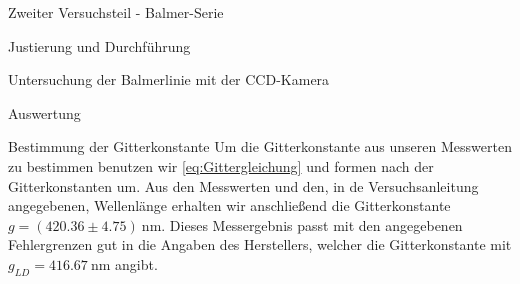 \documentclass[pdftex, a4paper,11pt, twoside, ngerman]{report}
\begin{document}
\begin{chapter}{Zweiter Versuchsteil - Balmer-Serie}
\begin{section}{Justierung und Durchführung}
\begin{subsection}{Untersuchung der Balmerlinie mit der CCD-Kamera}
      \end{subsection}

    \end{section}


    

    \begin{section}{Auswertung}
      \label{chp:Balmer:sec:Auswertung}
      
      
      
      \begin{subsection}{Bestimmung der Gitterkonstante}
        \label{chp:Balmer:sec:Auswertung:subsec:Gitterkonstante}
        Um die Gitterkonstante aus unseren Messwerten zu bestimmen benutzen 
        wir \cref{eq:Gittergleichung} und formen nach der Gitterkonstanten um.
        Aus den Messwerten und den, in de Versuchsanleitung angegebenen,
        Wellenlänge erhalten wir anschließend die Gitterkonstante
        $g=(420.36 \pm 4.75) \SI{}{\nano\meter}$. Dieses Messergebnis passt 
        mit den angegebenen Fehlergrenzen gut in die Angaben des Herstellers, 
        welcher die Gitterkonstante mit $g_{LD}=\SI{416.67}{\nano\meter}$ 
        angibt.\cite{bib:LDDidactic}
        
      \end{subsection}
      
      
      

\end{section}
\end{chapter}
\end{document}
